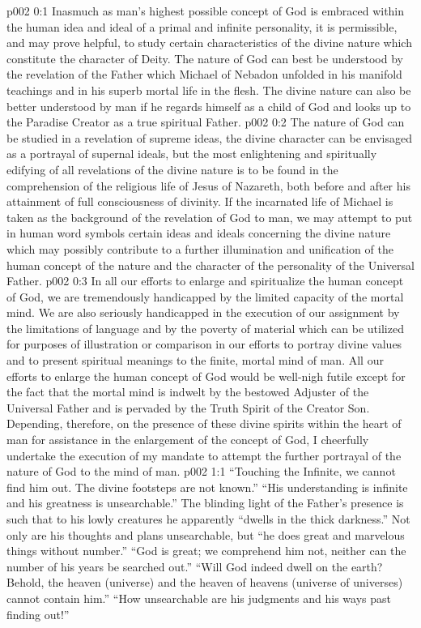 \author{Divine Counselor}
\vs p002 0:1 Inasmuch as man’s highest possible concept of God is embraced within the human idea and ideal of a primal and infinite personality, it is permissible, and may prove helpful, to study certain characteristics of the divine nature which constitute the character of Deity. The nature of God can best be understood by the revelation of the Father which Michael of Nebadon unfolded in his manifold teachings and in his superb mortal life in the flesh. The divine nature can also be better understood by man if he regards himself as a child of God and looks up to the Paradise Creator as a true spiritual Father.
\vs p002 0:2 The nature of God can be studied in a revelation of supreme ideas, the divine character can be envisaged as a portrayal of supernal ideals, but the most enlightening and spiritually edifying of all revelations of the divine nature is to be found in the comprehension of the religious life of Jesus of Nazareth, both before and after his attainment of full consciousness of divinity. If the incarnated life of Michael is taken as the background of the revelation of God to man, we may attempt to put in human word symbols certain ideas and ideals concerning the divine nature which may possibly contribute to a further illumination and unification of the human concept of the nature and the character of the personality of the Universal Father.
\vs p002 0:3 In all our efforts to enlarge and spiritualize the human concept of God, we are tremendously handicapped by the limited capacity of the mortal mind. We are also seriously handicapped in the execution of our assignment by the limitations of language and by the poverty of material which can be utilized for purposes of illustration or comparison in our efforts to portray divine values and to present spiritual meanings to the finite, mortal mind of man. All our efforts to enlarge the human concept of God would be well\hyp{}nigh futile except for the fact that the mortal mind is indwelt by the bestowed Adjuster of the Universal Father and is pervaded by the Truth Spirit of the Creator Son. Depending, therefore, on the presence of these divine spirits within the heart of man for assistance in the enlargement of the concept of God, I cheerfully undertake the execution of my mandate to attempt the further portrayal of the nature of God to the mind of man.\plusone
{}
\vs p002 1:1 “Touching the Infinite, we cannot find him out. The divine footsteps are not known.” “His understanding is infinite and his greatness is unsearchable.” The blinding light of the Father’s presence is such that to his lowly creatures he apparently “dwells in the thick darkness.” Not only are his thoughts and plans unsearchable, but “he does great and marvelous things without number.” “God is great; we comprehend him not, neither can the number of his years be searched out.” “Will God indeed dwell on the earth? Behold, the heaven (universe) and the heaven of heavens (universe of universes) cannot contain him.” “How unsearchable are his judgments and his ways past finding out!”
